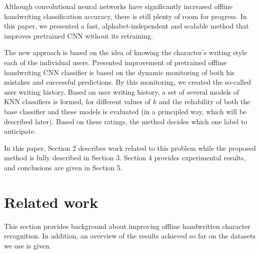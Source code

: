 \documentclass{article}
\begin{document}
Although convolutional neural networks have significantly increased offline handwriting classification accuracy, there is still plenty of room for progress. 
In this paper, we presented a fast, alphabet-independent and scalable method that improves pretrained CNN without its retraining. 

The new approach is based on the idea of knowing the character's writing style each of the individual users. 
Presented improvement of pretrained offline handwriting CNN classifier is based on the dynamic monitoring of both his mistakes and successful predictions. 
By this monitoring, we created the so-called user writing history. 
Based on user writing history, a set of several models of KNN classifiers is formed, for different values of $k$ and the reliability of both the base classifier and these models is evaluated (in a principled way, which will be described later). 
Based on these ratings, the method decides which one label to anticipate. 

In this paper, Section 2 describes work related to this problem while the proposed method is fully described in Section 3.
Section 4 provides experimental results, and conclusions are given in Section 5.

\section{Related work}  %

This section provides background about improving offline handwritten character recognition. 
In addition, an overview of the results achieved so far on the datasets we use is given. 
\end{document}
